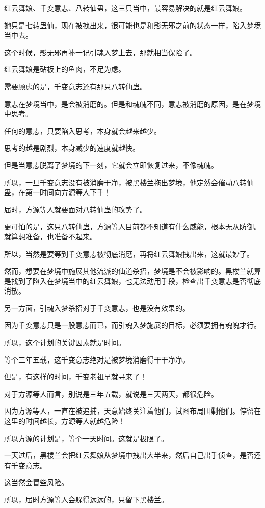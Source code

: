 \begin{this_body}
红云舞娘、千变意志、八转仙蛊，这三只当中，最容易解决的就是红云舞娘。

她只是七转蛊仙，现在被拽出来，很可能也是和影无邪之前的状态一样，陷入梦境当中去。

这个时候，影无邪再补一记引魂入梦上去，那就相当保险了。

红云舞娘是砧板上的鱼肉，不足为虑。

需要顾虑的是，千变意志还有那只八转仙蛊。

意志在梦境当中，是会被消磨的。但是和魂魄不同，意志被消磨的原因，是在梦境中思考。

任何的意志，只要陷入思考，本身就会越来越少。

思考的越是剧烈，本身减少的速度就越快。

但是当意志脱离了梦境的下一刻，它就会立即恢复过来，不像魂魄。

所以，一旦千变意志没有被消磨干净，被黑楼兰拖出梦境，他定然会催动八转仙蛊，在第一时间向方源等人下手！

届时，方源等人就要面对八转仙蛊的攻势了。

更可怕的是，这只八转仙蛊，方源等人目前都不知道有什么威能，根本无从防御。就算想准备，也准备不起来。

所以，当然是要等到千变意志被彻底消磨，再将红云舞娘拽出来，这就最妙了。

然而，想要在梦境中施展其他流派的仙道杀招，梦境是不会被影响的。黑楼兰就算是找到了陷入在梦境当中的红云舞娘，也无法动用手段，检查出千变意志是否彻底消散。

另一方面，引魂入梦杀招对于千变意志，也是没有效果的。

因为千变意志只是一股意志而已，而引魂入梦施展的目标，必须要拥有魂魄才行。

所以，这个计划的关键因素就是时间。

等个三年五载，这千变意志绝对是被梦境消磨得干干净净。

但是，有这样的时间，千变老祖早就寻来了！

对于方源等人而言，别说是三年五载，就说是三天两天，都很危险。

因为方源等人，一直在被追捕，天意始终关注着他们，试图布局围剿他们。停留在这里的时间越长，方源等人就越危险！

所以方源的计划是，等个一天时间。这就是极限了。

一天过后，黑楼兰会把红云舞娘从梦境中拽出大半来，然后自己出手侦查，是否还有千变意志。

这当然会冒些风险。

所以，届时方源等人会躲得远远的，只留下黑楼兰。


\end{this_body}
